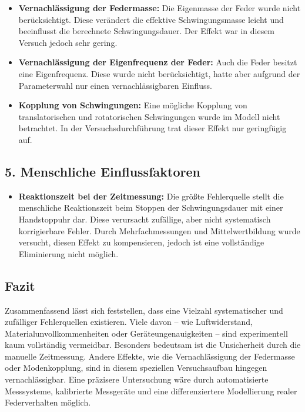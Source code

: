 \begin{itemize}
    \item \textbf{Vernachlässigung der Federmasse:} Die Eigenmasse der Feder wurde nicht berücksichtigt. Diese verändert die effektive Schwingungsmasse leicht und beeinflusst die berechnete Schwingungsdauer. Der Effekt war in diesem Versuch jedoch sehr gering.
    
    \item \textbf{Vernachlässigung der Eigenfrequenz der Feder:} Auch die Feder besitzt eine Eigenfrequenz. Diese wurde nicht berücksichtigt, hatte aber aufgrund der Parameterwahl nur einen vernachlässigbaren Einfluss.
    
    \item \textbf{Kopplung von Schwingungen:} Eine mögliche Kopplung von translatorischen und rotatorischen Schwingungen wurde im Modell nicht betrachtet. In der Versuchsdurchführung trat dieser Effekt nur geringfügig auf.
\end{itemize}

\subsection*{5. Menschliche Einflussfaktoren}

\begin{itemize}
    \item \textbf{Reaktionszeit bei der Zeitmessung:} Die größte Fehlerquelle stellt die menschliche Reaktionszeit beim Stoppen der Schwingungsdauer mit einer Handstoppuhr dar. Diese verursacht zufällige, aber nicht systematisch korrigierbare Fehler. Durch Mehrfachmessungen und Mittelwertbildung wurde versucht, diesen Effekt zu kompensieren, jedoch ist eine vollständige Eliminierung nicht möglich.
\end{itemize}

\subsection*{Fazit}

Zusammenfassend lässt sich feststellen, dass eine Vielzahl systematischer und zufälliger Fehlerquellen existieren. Viele davon – wie Luftwiderstand, Materialunvollkommenheiten oder Geräteungenauigkeiten – sind experimentell kaum vollständig vermeidbar. Besonders bedeutsam ist die Unsicherheit durch die manuelle Zeitmessung. Andere Effekte, wie die Vernachlässigung der Federmasse oder Modenkopplung, sind in diesem speziellen Versuchsaufbau hingegen vernachlässigbar. Eine präzisere Untersuchung wäre durch automatisierte Messsysteme, kalibrierte Messgeräte und eine differenziertere Modellierung realer Federverhalten möglich.
